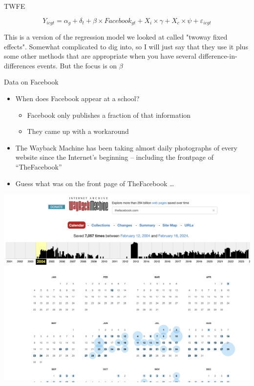 \documentclass{beamer}
\begin{document}
\begin{frame}{TWFE}

\begin{equation}
Y_{icgt} = \alpha_g + \delta_t + \beta \times Facebook_{gt} + X_i \times \gamma + X_c \times \psi + \varepsilon_{icgt}
\end{equation}

\bigskip

This is a version of the regression model we looked at called "twoway fixed effects".  Somewhat complicated to dig into, so I will just say that they use it plus some other methods that are appropriate when you have several difference-in-differences events.  But the focus is on $\beta$

\end{frame}


\begin{frame}{Data on Facebook}

\begin{itemize}

\item When does Facebook appear at a school?  
	\begin{itemize}
	\item Facebook only publishes a fraction of that information
	\item They came up with a workaround
	\end{itemize}
\item The Wayback Machine has been taking almost daily photographs of every website since the Internet's beginning -- including the frontpage of ``TheFacebook''
\item Guess what was on the front page of TheFacebook \dots

\end{itemize}

\end{frame}

\begin{frame}
\begin{center}
\includegraphics[scale=0.25]{./lecture_includes/wayback1}
\end{center}
\end{frame}
\end{document}
